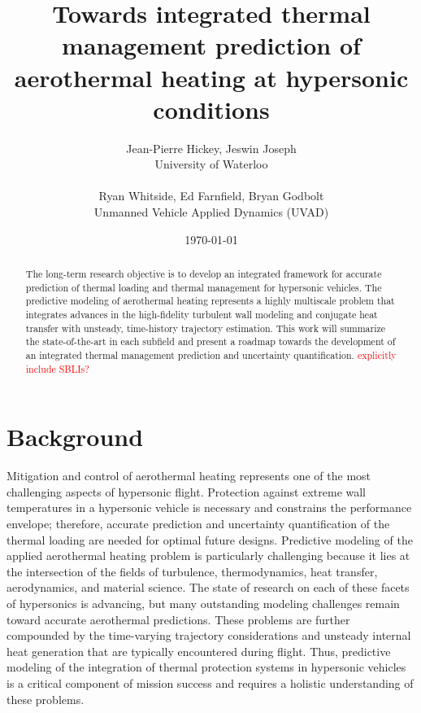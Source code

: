 \documentclass [11pt, fancyhdr, twoside] {article}
\newcommand{\rw}{\textcolor{red}}
\begin{document}
\title{Towards integrated thermal management prediction of aerothermal heating at hypersonic conditions}
\author {Jean-Pierre Hickey, Jeswin Joseph\\ University of Waterloo \\ \\
Ryan Whitside, Ed Farnfield, Bryan Godbolt\\
Unmanned Vehicle Applied Dynamics (UVAD)}

\date{\today}

\maketitle
\begin{abstract}
The long-term research objective is to develop an integrated framework for accurate prediction of thermal loading and thermal management for hypersonic vehicles. The predictive modeling of aerothermal heating represents a highly multiscale problem that integrates advances in the high-fidelity turbulent wall modeling and conjugate heat transfer with unsteady, time-history trajectory estimation. This work will summarize the state-of-the-art in each subfield and present a roadmap towards the development of an integrated thermal management prediction and uncertainty quantification. \rw{explicitly include SBLIs?}
\end{abstract}

\section{Background}
Mitigation and control of aerothermal heating represents one of the most challenging aspects of hypersonic flight. Protection against extreme wall temperatures in a hypersonic vehicle is necessary and constrains the performance envelope; therefore, accurate prediction and uncertainty quantification of the thermal loading are needed for optimal future designs. Predictive modeling of the applied aerothermal heating problem is particularly challenging because it lies at the intersection of the fields of turbulence, thermodynamics, heat transfer, aerodynamics, and material science. The state of research on each of these facets of hypersonics is advancing, but many outstanding modeling challenges remain toward accurate aerothermal predictions. These problems are further compounded by the time-varying trajectory considerations and unsteady internal heat generation that are typically encountered during flight. Thus, predictive modeling of the integration of thermal protection systems in hypersonic vehicles is a critical component of mission success and requires a holistic understanding of these problems.
\end{document}
